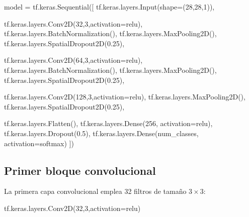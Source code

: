 \documentclass[
  spanish,
  us-letterpaper,
  DIV=11,
  numbers=noendperiod]{scrreprt}
\newenvironment{Shaded}{\begin{snugshade}}{\end{snugshade}}
\newcommand{\DecValTok}[1]{\textcolor[rgb]{0.68,0.00,0.00}{#1}}
\newcommand{\FloatTok}[1]{\textcolor[rgb]{0.68,0.00,0.00}{#1}}
\newcommand{\NormalTok}[1]{\textcolor[rgb]{0.00,0.23,0.31}{#1}}
\newcommand{\OperatorTok}[1]{\textcolor[rgb]{0.37,0.37,0.37}{#1}}
\newcommand{\StringTok}[1]{\textcolor[rgb]{0.13,0.47,0.30}{#1}}
\begin{document}
\begin{Shaded}
\begin{Highlighting}[]
\NormalTok{model }\OperatorTok{=}\NormalTok{ tf.keras.Sequential([}
\NormalTok{    tf.keras.layers.Input(shape}\OperatorTok{=}\NormalTok{(}\DecValTok{28}\NormalTok{,}\DecValTok{28}\NormalTok{,}\DecValTok{1}\NormalTok{)),}

\NormalTok{    tf.keras.layers.Conv2D(}\DecValTok{32}\NormalTok{,}\DecValTok{3}\NormalTok{,activation}\OperatorTok{=}\StringTok{\textquotesingle{}relu\textquotesingle{}}\NormalTok{),}
\NormalTok{    tf.keras.layers.BatchNormalization(),}
\NormalTok{    tf.keras.layers.MaxPooling2D(),}
\NormalTok{    tf.keras.layers.SpatialDropout2D(}\FloatTok{0.25}\NormalTok{),}

\NormalTok{    tf.keras.layers.Conv2D(}\DecValTok{64}\NormalTok{,}\DecValTok{3}\NormalTok{,activation}\OperatorTok{=}\StringTok{\textquotesingle{}relu\textquotesingle{}}\NormalTok{),}
\NormalTok{    tf.keras.layers.BatchNormalization(),}
\NormalTok{    tf.keras.layers.MaxPooling2D(),}
\NormalTok{    tf.keras.layers.SpatialDropout2D(}\FloatTok{0.25}\NormalTok{),}

\NormalTok{    tf.keras.layers.Conv2D(}\DecValTok{128}\NormalTok{,}\DecValTok{3}\NormalTok{,activation}\OperatorTok{=}\StringTok{\textquotesingle{}relu\textquotesingle{}}\NormalTok{),}
\NormalTok{    tf.keras.layers.MaxPooling2D(),}
\NormalTok{    tf.keras.layers.SpatialDropout2D(}\FloatTok{0.25}\NormalTok{),}

\NormalTok{    tf.keras.layers.Flatten(),}
\NormalTok{    tf.keras.layers.Dense(}\DecValTok{256}\NormalTok{, activation}\OperatorTok{=}\StringTok{\textquotesingle{}relu\textquotesingle{}}\NormalTok{),}
\NormalTok{    tf.keras.layers.Dropout(}\FloatTok{0.5}\NormalTok{),}
\NormalTok{    tf.keras.layers.Dense(num\_classes, activation}\OperatorTok{=}\StringTok{\textquotesingle{}softmax\textquotesingle{}}\NormalTok{)}
\NormalTok{])}
\end{Highlighting}
\end{Shaded}

\subsection{Primer bloque
convolucional}\label{primer-bloque-convolucional}

La primera capa convolucional emplea 32 filtros de tamaño \(3\times3\):

\begin{Shaded}
\begin{Highlighting}[]
\NormalTok{tf.keras.layers.Conv2D(}\DecValTok{32}\NormalTok{,}\DecValTok{3}\NormalTok{,activation}\OperatorTok{=}\StringTok{\textquotesingle{}relu\textquotesingle{}}\NormalTok{)}
\end{Highlighting}
\end{Shaded}
\end{document}

